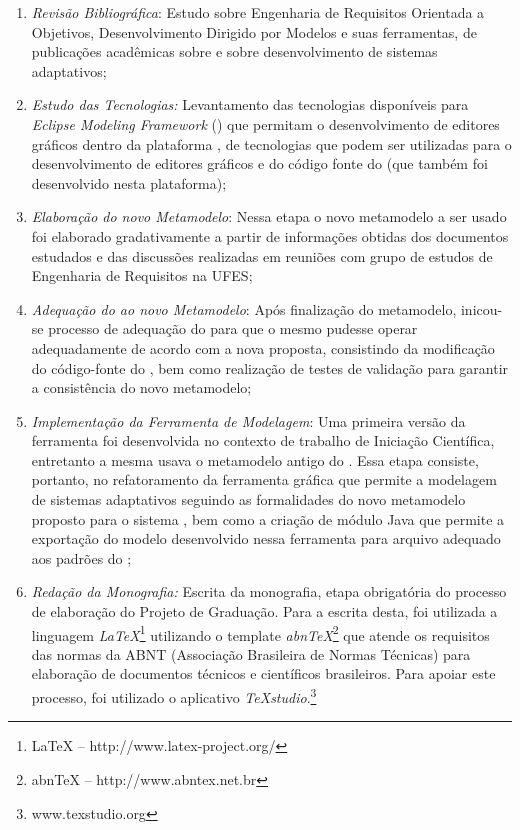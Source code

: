\begin{enumerate}
	
	\item \textit{Revisão Bibliográfica}: Estudo sobre Engenharia de Requisitos Orientada a Objetivos, Desenvolvimento Dirigido por Modelos e suas ferramentas, de publicações acadêmicas sobre \zanshin e sobre desenvolvimento de sistemas adaptativos;
	
	\item \textit{Estudo das Tecnologias:} Levantamento das tecnologias disponíveis para \textit{Eclipse Modeling Framework} (\emf) que permitam o desenvolvimento de editores gráficos dentro da plataforma \eclipse, de tecnologias que podem ser utilizadas para o desenvolvimento de editores gráficos e do código fonte do \zanshin (que também foi desenvolvido nesta plataforma);
	
	\item \textit{Elaboração do novo Metamodelo}: Nessa etapa o novo metamodelo a ser usado foi elaborado gradativamente a partir de informações obtidas dos documentos estudados e das discussões realizadas em reuniões com grupo de estudos de Engenharia de Requisitos na UFES;
	
	\item \textit{Adequação do \zanshin ao novo Metamodelo}: Após finalização do metamodelo, inicou-se processo de adequação do \framework para que o mesmo pudesse operar adequadamente de acordo com a nova proposta, consistindo da modificação do código-fonte do \zanshin, bem como realização de testes de validação para garantir a consistência do novo metamodelo;
	
	\item \textit{Implementação da Ferramenta de Modelagem}: Uma primeira versão da ferramenta foi desenvolvida no contexto de trabalho de Iniciação Científica, entretanto a mesma usava o metamodelo antigo do \zanshin. Essa etapa consiste, portanto, no refatoramento da ferramenta gráfica que permite a modelagem de sistemas adaptativos seguindo as formalidades do novo metamodelo proposto para o sistema \zanshin, bem como a criação de módulo Java que permite a exportação do modelo desenvolvido nessa ferramenta para arquivo \xml adequado aos padrões do \framework;
	
	\item \textit{Redação da Monografia:} Escrita da monografia, etapa obrigatória do processo de elaboração do Projeto de Graduação. Para a escrita desta, foi utilizada a linguagem \textit{LaTeX}\footnote{LaTeX -- http://www.latex-project.org/} utilizando o template \textit{abnTeX}\footnote{abnTeX -- http://www.abntex.net.br} que atende os requisitos das normas da ABNT (Associação Brasileira de Normas Técnicas) para elaboração de documentos técnicos e científicos brasileiros. Para apoiar este processo, foi utilizado o aplicativo \textit{TeXstudio}.\footnote{www.texstudio.org}
	
\end{enumerate}


